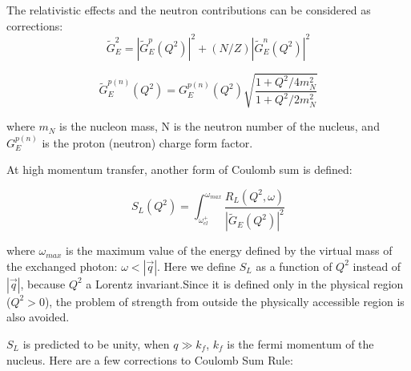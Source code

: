 The relativistic effects and the neutron contributions can be considered as corrections:
\begin{equation}
\tilde{G}^2_E = |\tilde{G}^p_E(Q^2)|^2 + (N/Z) |\tilde{G}^n_E(Q^2)|^2
\end{equation}

\begin{equation}
\tilde{G}^{p(n)}_E(Q^2) = G^{p(n)}_E(Q^2) \sqrt{\frac{1+Q^2/4m^2_N}{1+Q^2/2m^2_N}}
\end{equation}

where $m_N$ is the nucleon mass, N is the neutron number of the nucleus, and $G^{p(n)}_E$ is the proton (neutron)
charge form factor.

At high momentum transfer, another form of Coulomb sum is defined:

\begin{equation}
S_L(Q^2) = \int_{\omega_{el}^{+}}^{\omega_{max}} \frac{R_L(Q^2,\omega)}{|\tilde{G}_E(Q^2)|^2}
\end{equation}

where $\omega_{max}$ is the maximum value of the energy defined by the virtual mass of the exchanged photon:
$\omega < |\vec{q}|$. Here we define $S_L$ as a function of $Q^2$ instead of $|\vec{q}|$, because $Q^2$
a Lorentz invariant.Since it is defined only in the physical region
($Q^2>0$), the problem of strength from outside the physically accessible region is
also avoided.

$S_L$ is predicted to be unity, when $q \gg k_f$, $k_f$ is the fermi momentum of the nucleus.
Here are a few corrections to Coulomb Sum Rule:

